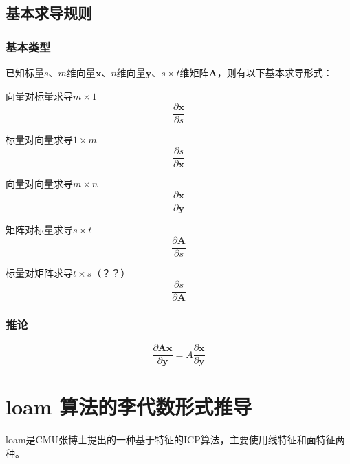 \documentclass{ctexart}
\begin{document}
{	\subsection{基本求导规则}
	\subsubsection{基本类型}
	\par 已知标量$s$、$m$维向量$\boldsymbol{x}$、$n$维向量$\boldsymbol{y}$、$s\times t$维矩阵$\boldsymbol{A}$，则有以下基本求导形式：
	
	\par 向量对标量求导$m\times 1$
	\begin{equation}
	\frac{\partial\boldsymbol{x}}{\partial s}
	\end{equation}
	
	\par 标量对向量求导$1\times m$
	\begin{equation}
	\frac{\partial s}{\partial\boldsymbol{x}}
	\end{equation}
	
	\par 向量对向量求导$m\times n$
	\begin{equation}
	\frac{\partial\boldsymbol{x}}{\partial\boldsymbol{y}}
	\end{equation}
	
	\par 矩阵对标量求导$s\times t$
	\begin{equation}
	\frac{\partial\boldsymbol{A}}{\partial s}
	\end{equation}
	
	\par 标量对矩阵求导$t\times s$（？？）
	\begin{equation}
	\frac{\partial s}{\partial\boldsymbol{A}}
	\end{equation}
	
	\subsubsection{推论}
	\begin{equation}
	\frac{\partial \boldsymbol{Ax}}{\partial \boldsymbol{y}}
	=
	A \frac{\partial \boldsymbol{x}}{\partial \boldsymbol{y}}
	\end{equation}
	
	
	
	\section{loam 算法的李代数形式推导}
	\newcommand{\vecba}[1]{\boldmath\overrightarrow{#1}\unboldmath}
	loam是CMU张博士提出的一种基于特征的ICP算法，主要使用线特征和面特征两种。
}
\end{document}
